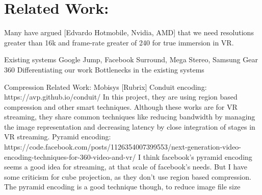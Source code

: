 \section{Related Work:}

Many have argued [Edvardo Hotmobile, Nvidia, AMD] that we need resolutions greater than 16k and frame-rate greater of 240 for true immersion in VR.


Existing systems \newline
Google Jump, Facebook Surround, Mega Stereo, Samsung Gear 360 \newline
Differentiating our work \newline
Bottlenecks in the existing systems \newline


Compression Related Work: 
Mobisys [Rubrix]
Conduit encoding:
https://avp.github.io/conduit/
In this  project, they are using region based compression and other smart techniques. Although these works are for VR streaming, they share common techniques like reducing bandwidth by managing the image representation and decreasing latency by close integration of stages in VR streaming.
Pyramid encoding: https://code.facebook.com/posts/1126354007399553/next-generation-video-encoding-techniques-for-360-video-and-vr/
I think facebook's pyramid encoding seems a good idea for streaming, at that scale of facebook's needs. But I have some criticism for  cube projection, as they don't use region based compression. The pyramid encoding is a good technique though, to reduce image file size

